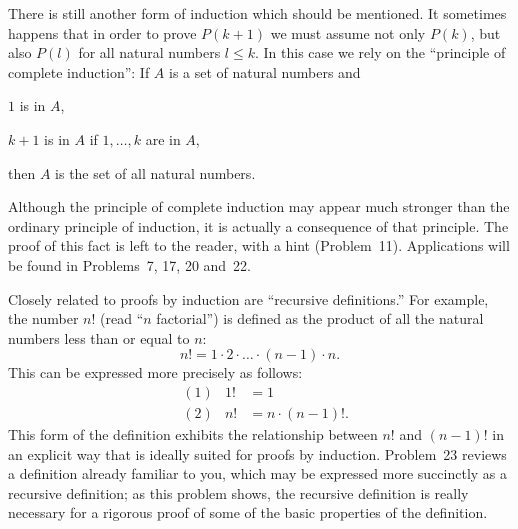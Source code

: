 There is still another form of induction which should be mentioned. It
sometimes happens that in order to prove $P(k+1)$ we must assume not only
$P(k)$, but also $P(l)$ for all natural numbers $l \leq k$. In this case we
rely on the ``principle of complete induction'': If $A$ is a set of natural
numbers and

\begin{steps}
\item $1$ is in $A$,
\item $k + 1$ is in $A$ if $1, \dots, k$ are in $A$,
\end{steps}

then $A$ is the set of all natural numbers.

Although the principle of complete induction may appear much stronger than
the ordinary principle of induction, it is actually a consequence of that
principle. The proof of this fact is left to the reader, with a hint
(Problem~11). Applications will be found in Problems~7, 17, 20 and~22.

Closely related to proofs by induction are ``recursive definitions.'' For
example, the number $n!$ (read ``$n$ factorial'') is defined as the product of
all the natural numbers less than or equal to $n$:
\[ n! = 1 \cdot 2 \cdot \ldots \cdot (n-1) \cdot n. \]
This can be expressed more precisely as follows:
\begin{align*}
&(1) & 1! &= 1\\
&(2) & n! &= n \cdot (n-1)!.
\end{align*}
This form of the definition exhibits the relationship between $n!$ and
$(n-1)!$ in an explicit way that is ideally suited for proofs by induction.
Problem~23 reviews a definition already familiar to you, which may be
expressed more succinctly as a recursive definition; as this problem shows,
the recursive definition is really necessary for a rigorous proof of some of
the basic properties of the definition.

